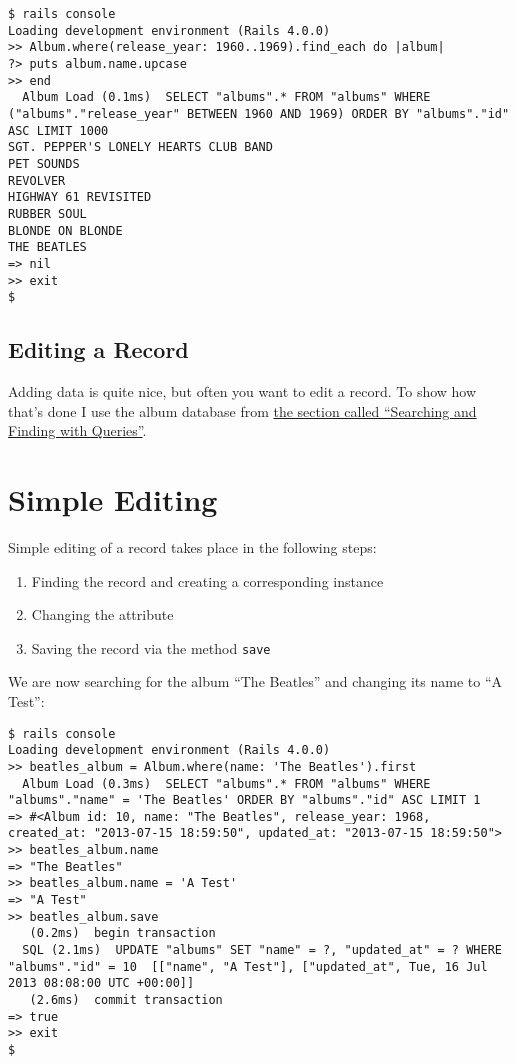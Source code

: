\documentclass[a4paper]{book}
\newcounter{tab}[chapter]
\newcommand{\chap}[1]{\newpage\thispagestyle{empty}\chapter{#1}\label{chap:\thechapter}}
\begin{document}
\begin{shaded}\begin{verbatim}
$ rails console
Loading development environment (Rails 4.0.0)
>> Album.where(release_year: 1960..1969).find_each do |album|
?> puts album.name.upcase
>> end
  Album Load (0.1ms)  SELECT "albums".* FROM "albums" WHERE ("albums"."release_year" BETWEEN 1960 AND 1969) ORDER BY "albums"."id" ASC LIMIT 1000
SGT. PEPPER'S LONELY HEARTS CLUB BAND
PET SOUNDS
REVOLVER
HIGHWAY 61 REVISITED
RUBBER SOUL
BLONDE ON BLONDE
THE BEATLES
=> nil
>> exit
$
\end{verbatim}\end{shaded}

\section{Editing a Record}\label{editing-a-record}

Adding data is quite nice, but often you want to edit a record. To show how that's done I use the album database from \hyperref[queries]{the section called “Searching and Finding with Queries”}.

\chap{Simple Editing}\label{simple-editing}

Simple editing of a record takes place in the following steps:

\begin{enumerate}
\def\labelenumi{\arabic{enumi}.}
\itemsep1pt\parskip0pt
\item
  Finding the record and creating a corresponding instance
\item
  Changing the attribute
\item
  Saving the record via the method \texttt{save}
\end{enumerate}

We are now searching for the album “The Beatles” and changing its name to “A Test”:

\begin{shaded}\begin{verbatim}
$ rails console
Loading development environment (Rails 4.0.0)
>> beatles_album = Album.where(name: 'The Beatles').first
  Album Load (0.3ms)  SELECT "albums".* FROM "albums" WHERE "albums"."name" = 'The Beatles' ORDER BY "albums"."id" ASC LIMIT 1
=> #<Album id: 10, name: "The Beatles", release_year: 1968, created_at: "2013-07-15 18:59:50", updated_at: "2013-07-15 18:59:50">
>> beatles_album.name
=> "The Beatles"
>> beatles_album.name = 'A Test'
=> "A Test"
>> beatles_album.save
   (0.2ms)  begin transaction
  SQL (2.1ms)  UPDATE "albums" SET "name" = ?, "updated_at" = ? WHERE "albums"."id" = 10  [["name", "A Test"], ["updated_at", Tue, 16 Jul 2013 08:08:00 UTC +00:00]]
   (2.6ms)  commit transaction
=> true
>> exit
$
\end{verbatim}\end{shaded}
\end{document}
